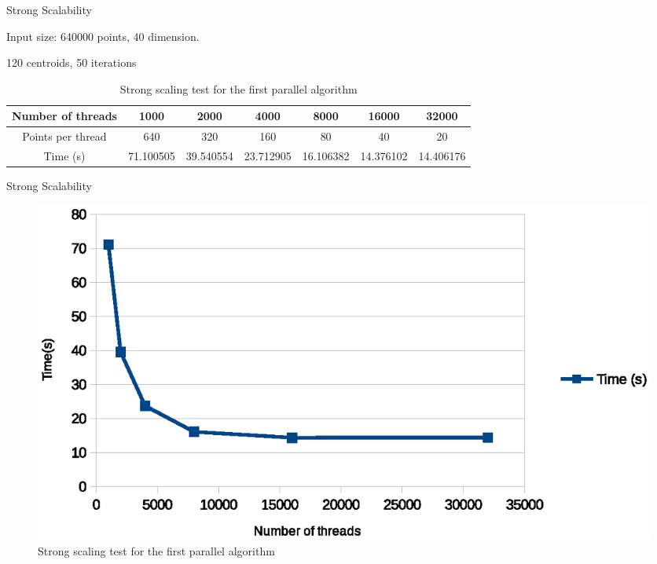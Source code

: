 \documentclass[
nopagebreaks,
style=klope,
fleqn]{powerdot}
\begin{document}
\begin{slide}{Strong Scalability}
  \begin{compactitem}
  \item{Input size: 640000 points, 40 dimension. }
  \item{120 centroids, 50 iterations}  
  \end{compactitem}
  \scriptsize
  \begin{table}[ht]
  \centering
  \begin{tabular}{|c|c|c|c|c|c|c|}
    \hline
    Number of threads	& 1000	    & 2000	    & 4000	& 8000	& 16000 & 32000\\
    \hline
    Points per thread 	&640	&320	&160	&80	&40	&20 \\
    \hline
    Time (s)	 & 71.100505	& 39.540554	& 23.712905	& 16.106382	& 14.376102	& 14.406176	\\
    \hline
  \end{tabular}
  \label{tab:strong-scaling}
  \caption{Strong scaling test for the first parallel algorithm}
\end{table}
\end{slide}

\begin{slide}{Strong Scalability}
\begin{figure}[!h]
  \centering
  \includegraphics[width=\linewidth]{fig/strong_scaling}
  \caption{Strong scaling test for the first parallel algorithm}
  \label{fig:strong_scaling}
\end{figure}

\end{slide}
\end{document}
